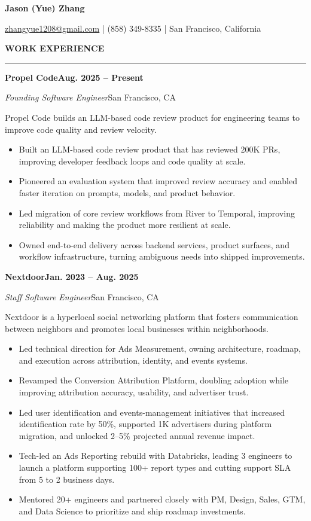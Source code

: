 \documentclass[10pt,letterpaper]{article}
\newcommand{\resumesection}[1]{
  \vspace{10pt}
  {\normalsize\bfseries\MakeUppercase{#1}\par}
  \vspace{3pt}
  \hrule
  \vspace{7pt}
}
\newcommand{\companyheading}[2]{
  \noindent\textbf{#1}\hfill\textbf{#2}\par
}
\newcommand{\roleheading}[2]{
  \noindent\textit{#1}\hfill #2\par
}
\newcommand{\companysummary}[1]{
  {\small #1\par}
  \vspace{2pt}
}
\newcommand{\entryspace}{
  \vspace{6pt}
}
\begin{document}
{\LARGE \textbf{Jason (Yue) Zhang}\par}
\vspace{4pt}
{\normalsize
\href{mailto:zhangyue1208@gmail.com}{zhangyue1208@gmail.com}
\;|\;
(858) 349-8335
\;|\;
San Francisco, California\par
}

\resumesection{Work Experience}

\companyheading{Propel Code}{Aug. 2025 -- Present}
\roleheading{Founding Software Engineer}{San Francisco, CA}
\companysummary{Propel Code builds an LLM-based code review product for engineering teams to improve code quality and review velocity.}
\begin{itemize}\small
  \item Built an LLM-based code review product that has reviewed 200K PRs, improving developer feedback loops and code quality at scale.
  \item Pioneered an evaluation system that improved review accuracy and enabled faster iteration on prompts, models, and product behavior.
  \item Led migration of core review workflows from River to Temporal, improving reliability and making the product more resilient at scale.
  \item Owned end-to-end delivery across backend services, product surfaces, and workflow infrastructure, turning ambiguous needs into shipped improvements.
\end{itemize}
\entryspace
\normalsize

\companyheading{Nextdoor}{Jan. 2023 -- Aug. 2025}
\roleheading{Staff Software Engineer}{San Francisco, CA}
\companysummary{Nextdoor is a hyperlocal social networking platform that fosters communication between neighbors and promotes local businesses within neighborhoods.}
\begin{itemize}\small
  \item Led technical direction for Ads Measurement, owning architecture, roadmap, and execution across attribution, identity, and events systems.
  \item Revamped the Conversion Attribution Platform, doubling adoption while improving attribution accuracy, usability, and advertiser trust.
  \item Led user identification and events-management initiatives that increased identification rate by 50\%, supported 1K advertisers during platform migration, and unlocked 2--5\% projected annual revenue impact.
  \item Tech-led an Ads Reporting rebuild with Databricks, leading 3 engineers to launch a platform supporting 100+ report types and cutting support SLA from 5 to 2 business days.
  \item Mentored 20+ engineers and partnered closely with PM, Design, Sales, GTM, and Data Science to prioritize and ship roadmap investments.
\end{itemize}
\entryspace
\normalsize
\end{document}
